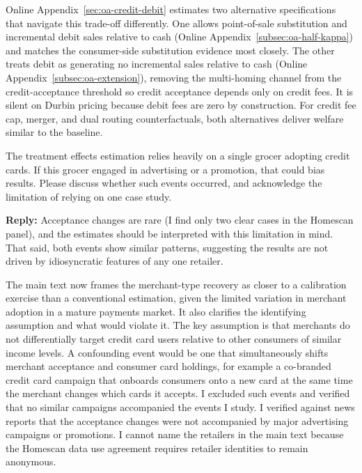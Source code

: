 \documentclass[main.tex]{subfiles}
\begin{document}
\begin{refsection}
Online Appendix~\ref{sec:oa-credit-debit} estimates two alternative specifications that navigate this trade-off differently.
One allows point-of-sale substitution and incremental debit sales relative to cash (Online Appendix~\ref{subsec:oa-half-kappa}) and matches the consumer-side substitution evidence most closely.
The other treats debit as generating no incremental sales relative to cash (Online Appendix~\ref{subsec:oa-extension}), removing the multi-homing channel from the credit-acceptance threshold so credit acceptance depends only on credit fees.
It is silent on Durbin pricing because debit fees are zero by construction.
For credit fee cap, merger, and dual routing counterfactuals, both alternatives deliver welfare similar to the baseline.

\begin{refcommentnoclear}
The treatment effects estimation relies heavily on a single grocer adopting credit cards.
If this grocer engaged in advertising or a promotion, that could bias results.
Please discuss whether such events occurred, and acknowledge the limitation of relying on one case study.

\end{refcommentnoclear}

\textbf{Reply:} Acceptance changes are rare (I find only two clear cases in the Homescan panel), and the estimates should be interpreted with this limitation in mind.
That said, both events show similar patterns, suggesting the results are not driven by idiosyncratic features of any one retailer.

The main text now frames the merchant-type recovery as closer to a calibration exercise than a conventional estimation, given the limited variation in merchant adoption in a mature payments market.
It also clarifies the identifying assumption and what would violate it.
The key assumption is that merchants do not differentially target credit card users relative to other consumers of similar income levels.
A confounding event would be one that simultaneously shifts merchant acceptance and consumer card holdings, for example a co-branded credit card campaign that onboards consumers onto a new card at the same time the merchant changes which cards it accepts.
I excluded such events and verified that no similar campaigns accompanied the events I study.
I verified against news reports that the acceptance changes were not accompanied by major advertising campaigns or promotions.
I cannot name the retailers in the main text because the Homescan data use agreement requires retailer identities to remain anonymous.


\end{refsection}
\end{document}
